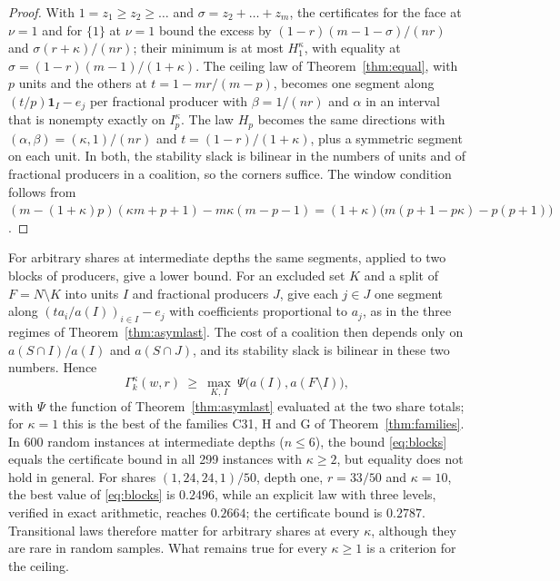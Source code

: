 \documentclass[11pt,a4paper]{article}
\theoremstyle{remark}
\newcommand{\one}{\mathbf 1}
\begin{document}
\begin{proof}
With $1=z_1\ge z_2\ge\dots$ and $\sigma=z_2+\dots+z_m$, the certificates for
the face at $\nu=1$ and for $\{1\}$ at $\nu=1$ bound the excess by
$(1-r)(m-1-\sigma)/(nr)$ and $\sigma(r+\kappa)/(nr)$; their minimum is at most
$H_1^\kappa$, with equality at $\sigma=(1-r)(m-1)/(1+\kappa)$. The ceiling law
of Theorem~\ref{thm:equal}, with $p$ units and the others at
$t=1-mr/(m-p)$, becomes one segment along $(t/p)\one_I-e_j$ per fractional
producer with $\beta=1/(nr)$ and $\alpha$ in an interval that is nonempty
exactly on $I_p^\kappa$. The law $H_p$ becomes the same directions with
$(\alpha,\beta)=(\kappa,1)/(nr)$ and $t=(1-r)/(1+\kappa)$, plus a symmetric
segment on each unit. In both, the stability slack is bilinear in the numbers
of units and of fractional producers in a coalition, so the corners suffice.
The window condition follows from
$(m-(1+\kappa)p)(\kappa m+p+1)-m\kappa(m-p-1)
=(1+\kappa)\bigl(m(p+1-p\kappa)-p(p+1)\bigr)$.
\end{proof}

For arbitrary shares at intermediate depths the same segments, applied to two
blocks of producers, give a lower bound. For an excluded set $K$ and a split
of $F=N\setminus K$ into units $I$ and fractional producers $J$, give each
$j\in J$ one segment along $(ta_i/a(I))_{i\in I}-e_j$ with coefficients
proportional to $a_j$, as in the three regimes of
Theorem~\ref{thm:asymlast}. The cost of a coalition then depends only on
$a(S\cap I)/a(I)$ and $a(S\cap J)$, and its stability slack is bilinear in
these two numbers. Hence
\begin{equation}\label{eq:blocks}
\Gamma_k^\kappa(w,r)\ \ge\ \max_{K,\,I}\ \Psi\bigl(a(I),a(F\setminus I)\bigr),
\end{equation}
with $\Psi$ the function of Theorem~\ref{thm:asymlast} evaluated at the two
share totals; for $\kappa=1$ this is the best of the families C31, H and G of
Theorem~\ref{thm:families}.
In 600 random instances at intermediate depths ($n\le6$), the bound
\eqref{eq:blocks} equals the certificate bound in all 299 instances with
$\kappa\ge2$, but equality does not hold in general. For shares
$(1,24,24,1)/50$, depth one, $r=33/50$ and $\kappa=10$, the best value of
\eqref{eq:blocks} is $0.2496$, while an explicit law with three levels,
verified in exact arithmetic, reaches $0.2664$; the certificate bound is
$0.2787$. Transitional laws therefore matter for arbitrary shares at every
$\kappa$, although they are rare in random samples. What remains true for
every $\kappa\ge1$ is a criterion for the ceiling.
\end{document}
